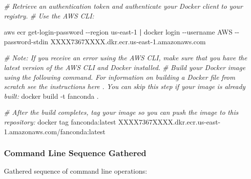 \documentclass[
]{book}
\newenvironment{Shaded}{\begin{snugshade}}{\end{snugshade}}
\newcommand{\CommentTok}[1]{\textcolor[rgb]{0.56,0.35,0.01}{\textit{#1}}}
\newcommand{\ExtensionTok}[1]{#1}
\newcommand{\KeywordTok}[1]{\textcolor[rgb]{0.13,0.29,0.53}{\textbf{#1}}}
\newcommand{\NormalTok}[1]{#1}
\begin{document}
\begin{Shaded}
\begin{Highlighting}[]
\CommentTok{\# Retrieve an authentication token and authenticate your Docker client to your registry.}
\CommentTok{\# Use the AWS CLI:}

\ExtensionTok{aws}\NormalTok{ ecr get{-}login{-}password {-}{-}region us{-}east{-}1 }\KeywordTok{|} \ExtensionTok{docker}\NormalTok{ login {-}{-}username AWS {-}{-}password{-}stdin XXXX7367XXXX.dkr.ecr.us{-}east{-}1.amazonaws.com}

\CommentTok{\# Note: If you receive an error using the AWS CLI, make sure that you have the latest version of the AWS CLI and Docker installed.}
\CommentTok{\# Build your Docker image using the following command. For information on building a Docker file from scratch see the instructions here . You can skip this step if your image is already built:}
\ExtensionTok{docker}\NormalTok{ build {-}t fanconda .}

\CommentTok{\# After the build completes, tag your image so you can push the image to this repository:}
\ExtensionTok{docker}\NormalTok{ tag fanconda:latest XXXX7367XXXX.dkr.ecr.us{-}east{-}1.amazonaws.com/fanconda:latest}
\end{Highlighting}
\end{Shaded}

\hypertarget{command-line-sequence-gathered}{%
\subsubsection{Command Line Sequence Gathered}\label{command-line-sequence-gathered}}

Gathered sequence of command line operations:
\end{document}
